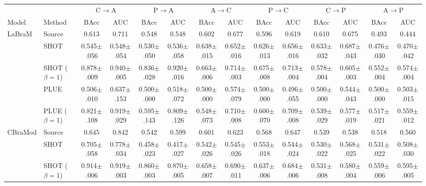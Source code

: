 \documentclass[letterpaper]{article} %
\begin{document}
\begin{table}[!t]
    \centering
    \setlength{\tabcolsep}{1.2pt}
    \renewcommand{\arraystretch}{1.1}
    \begin{tabular}{ll cc cc cc cc cc cc}
    \toprule
    & & \multicolumn{2}{c}{C$\to$A} & \multicolumn{2}{c}{P$\to$A} & \multicolumn{2}{c}{A$\to$C} & \multicolumn{2}{c}{P$\to$C} & \multicolumn{2}{c}{C$\to$P} & \multicolumn{2}{c}{A$\to$P} \\
    \cmidrule(lr){3-4}\cmidrule(lr){5-6}\cmidrule(lr){7-8}\cmidrule(lr){9-10}\cmidrule(lr){11-12}\cmidrule(lr){13-14}
    Model & Method & BAcc & AUC & BAcc & AUC & BAcc & AUC & BAcc & AUC & BAcc & AUC & BAcc & AUC \\
    \midrule
    LaBraM & Source & 0.613 & 0.711 & 0.548 & 0.548 & 0.602 & 0.677 & 0.596 & 0.619 & 0.610 & 0.675 & 0.493 & 0.444 \\
     & SHOT & 0.545{$\pm$.056} & 0.548{$\pm$.054} & 0.530{$\pm$.050} & 0.536{$\pm$.058} & 0.638{$\pm$.015} & 0.652{$\pm$.016} & 0.626{$\pm$.013} & 0.656{$\pm$.016} & 0.633{$\pm$.032} & 0.687{$\pm$.043} & 0.476{$\pm$.030} & 0.470{$\pm$.042} \\
     & SHOT ($\beta{=}1$) & 0.878{$\pm$.009} & 0.940{$\pm$.005} & 0.836{$\pm$.028} & 0.920{$\pm$.016} & 0.663{$\pm$.006} & 0.714{$\pm$.003} & 0.675{$\pm$.008} & 0.713{$\pm$.004} & 0.578{$\pm$.004} & 0.605{$\pm$.003} & 0.552{$\pm$.004} & 0.574{$\pm$.004} \\
     & PLUE & 0.506{$\pm$.010} & 0.637{$\pm$.153} & 0.500{$\pm$.000} & 0.518{$\pm$.072} & 0.500{$\pm$.000} & 0.574{$\pm$.079} & 0.500{$\pm$.000} & 0.496{$\pm$.055} & 0.500{$\pm$.000} & 0.544{$\pm$.043} & 0.500{$\pm$.000} & 0.503{$\pm$.015} \\
     & PLUE ($\beta{=}1$) & 0.821{$\pm$.108} & 0.919{$\pm$.029} & 0.595{$\pm$.143} & 0.809{$\pm$.126} & 0.548{$\pm$.073} & 0.710{$\pm$.008} & 0.600{$\pm$.070} & 0.709{$\pm$.008} & 0.539{$\pm$.029} & 0.577{$\pm$.019} & 0.517{$\pm$.021} & 0.559{$\pm$.012} \\
    \midrule
    CBraMod & Source & 0.645 & 0.842 & 0.542 & 0.599 & 0.601 & 0.623 & 0.568 & 0.647 & 0.539 & 0.538 & 0.518 & 0.560 \\
     & SHOT & 0.705{$\pm$.058} & 0.778{$\pm$.034} & 0.458{$\pm$.023} & 0.417{$\pm$.027} & 0.542{$\pm$.026} & 0.545{$\pm$.026} & 0.553{$\pm$.018} & 0.544{$\pm$.024} & 0.530{$\pm$.022} & 0.568{$\pm$.025} & 0.531{$\pm$.022} & 0.508{$\pm$.030} \\
     & SHOT ($\beta{=}1$) & 0.914{$\pm$.006} & 0.919{$\pm$.003} & 0.860{$\pm$.003} & 0.870{$\pm$.005} & 0.658{$\pm$.007} & 0.690{$\pm$.011} & 0.637{$\pm$.006} & 0.684{$\pm$.006} & 0.531{$\pm$.008} & 0.580{$\pm$.004} & 0.559{$\pm$.006} & 0.595{$\pm$.005} \\

\end{tabular}
\end{table}
\end{document}
